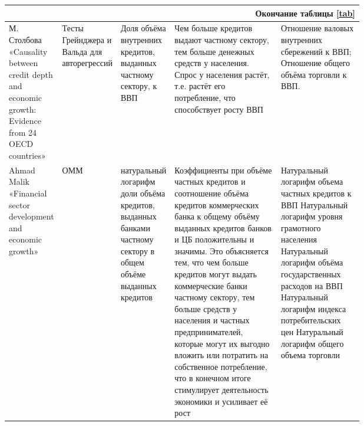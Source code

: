 \begin{table}[H]
	\begin{tabularx}{\textwidth}
		{|p{0.15\linewidth}|p{0.1\linewidth}|p{0.15\linewidth}|p{0.3\linewidth}|X|}
		\multicolumn{5}{r}{\normalsize Окончание таблицы \ref{tab}}\\\hline
		М. Столбова \newline «Causality between credit depth and economic growth: Evidence from 24 OECD countries» & Тесты Грейнджера и Вальда для авторегрессий& Доля объёма внутренних кредитов, выданных частному сектору, к ВВП  &Чем больше кредитов выдают частному сектору, тем больше денежных средств у населения. Спрос у населения растёт, т.е. растёт его потребление, что способствует росту ВВП& Отношение валовых внутренних сбережений к ВВП; \newline Отношение общего объёма торговли к ВВП. \\\hline
		Ahmad \newline Malik «Financial sector development and economic growth» & ОММ & натуральный логарифм доли объёма кредитов, выданных банками частному сектору в общем объёме выданных кредитов & Коэффициенты при объёме частных кредитов и соотношение объёма кредитов коммерческих банка к общему объёму выданных  кредитов банков и ЦБ положительны и значимы.  Это объясняется тем, что чем больше кредитов могут выдать коммерческие банки частному сектору, тем больше средств у населения и частных предпринимателей, которые могут их выгодно вложить или потратить на собственное потребление, что в конечном итоге стимулирует деятельность экономики и усиливает её рост & Натуральный логарифм объема частных кредитов к ВВП \newline Натуральный логарифм уровня грамотного населения \newline Натуральный логарифм объёма государственных расходов на ВВП \newline Натуральный логарифм индекса потребительских цен \newline Натуральный логарифм общего объема торговли\\\hline
	\end{tabularx}
\end{table}

